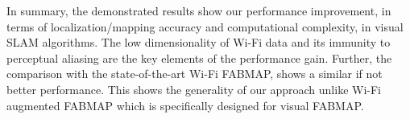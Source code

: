 In summary, the demonstrated results show our performance improvement, in terms of localization/mapping accuracy and computational complexity, in visual SLAM algorithms.
The low dimensionality of Wi-Fi data and its immunity to perceptual aliasing are the key elements of the performance gain.
Further, the comparison with the state-of-the-art Wi-Fi FABMAP, shows a similar if not better performance.
This shows the generality of our approach unlike Wi-Fi augmented FABMAP which is specifically designed for visual FABMAP.
%
%

